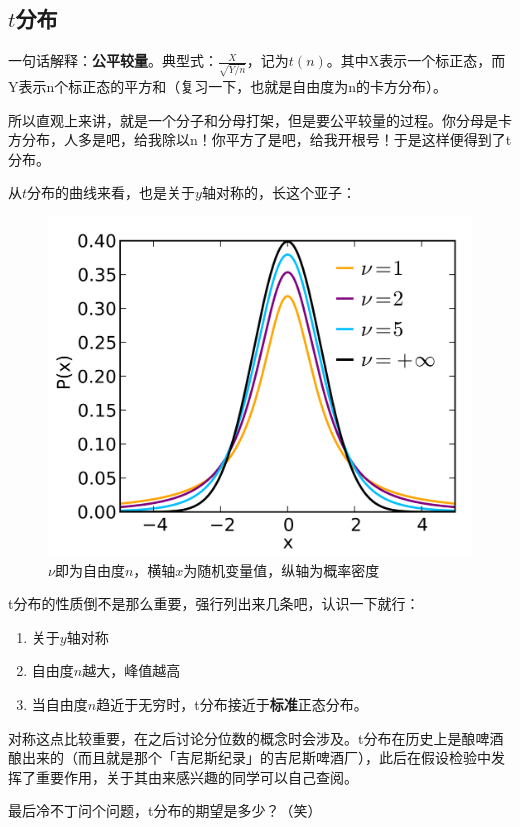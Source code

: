 \documentclass[10pt, a4paper]{article}
\begin{document}
\subsection{$t$分布}
一句话解释：\textbf{公平较量}。典型式：$\frac{X}{\sqrt{Y/n}}$，记为$t(n)$。其中X表示一个标正态，而Y表示n个标正态的平方和（复习一下，也就是自由度为n的卡方分布）。\par
所以直观上来讲，就是一个分子和分母打架，但是要公平较量的过程。你分母是卡方分布，人多是吧，给我除以n！你平方了是吧，给我开根号！于是这样便得到了t分布。\par
从$t$分布的曲线来看，也是关于$y$轴对称的，长这个亚子：
\begin{figure}[H]
    \centering
    \includegraphics[width=0.5\linewidth]{t.png}
    \caption{$\nu$即为自由度$n$，横轴$x$为随机变量值，纵轴为概率密度}
    \label{fig:t}
\end{figure}
t分布的性质倒不是那么重要，强行列出来几条吧，认识一下就行：
\begin{enumerate}
    \item 关于$y$轴对称
    \item 自由度$n$越大，峰值越高
    \item 当自由度$n$趋近于无穷时，t分布接近于\textbf{标准}正态分布。
\end{enumerate}\par
对称这点比较重要，在之后讨论分位数的概念时会涉及。t分布在历史上是酿啤酒酿出来的（而且就是那个「吉尼斯纪录」的吉尼斯啤酒厂），此后在假设检验中发挥了重要作用，关于其由来感兴趣的同学可以自己查阅。\par
最后冷不丁问个问题，t分布的期望是多少？（笑）
\end{document}
